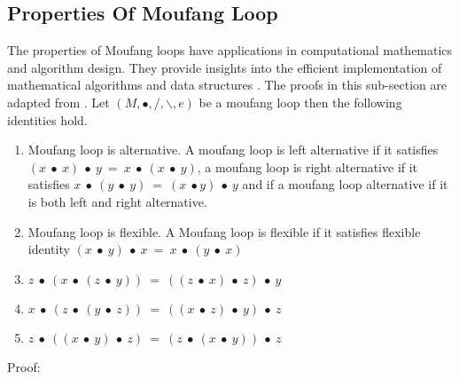 \subsection{Properties Of Moufang Loop}
The properties of Moufang loops have applications in computational mathematics
and algorithm design. They provide insights into the efficient implementation of
mathematical algorithms and data structures \cite{kunen1996moufang}. The proofs
in this sub-section are adapted from \cite{Stener2016MoufangL}. Let $(M, ∙, /,
\backslash, e)$ be a moufang loop then the following identities hold.
\begin{enumerate}
\item Moufang loop is alternative. A moufang loop is left alternative if it
satisfies \((x\ ∙\ x)\ ∙\ y\ =\ x\ ∙\ (x\ ∙\ y)\), a moufang loop is right
alternative if it satisfies \(x\ ∙\ (y\ ∙\ y)\ =\ (x\ ∙ y)\ ∙\ y\) and if a
moufang loop alternative if it is both left and right alternative. 
\item Moufang loop is flexible. A Moufang loop is flexible if it satisfies
flexible identity $(x\ ∙\ y)\ ∙\ x\ =\ x\ ∙\ (y\ ∙\ x)$
\item $z\ ∙\ (x\ ∙\ (z\ ∙\ y))\ =\ ((z\ ∙\ x)\ ∙\ z)\ ∙\ y$
\item $x\ ∙\ (z\ ∙\ (y\ ∙\ z))\ =\ ((x\ ∙\ z)\ ∙\ y)\ ∙\ z$ 
\item $z\ ∙\ ((x\ ∙\ y)\ ∙\ z)\ =\ (z\ ∙ \ (x\ ∙\ y))\ ∙\ z$ 
\end{enumerate}
Proof:
